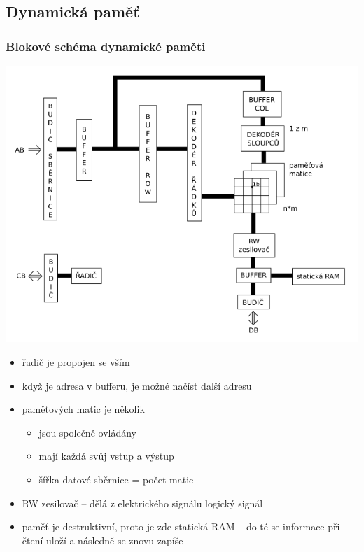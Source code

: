 \documentclass[a4paper,12pt]{article}
\providecommand{\tightlist}{%
\setlength{\itemsep}{0pt}\setlength{\parskip}{0pt}}
\begin{document}
\subsection{Dynamická paměť}

\subsubsection{Blokové schéma dynamické paměti}

\includegraphics[width=17cm]{ref/blokove-schema-dynamicke-pameti.png}

\begin{itemize}
\tightlist
\item řadič je propojen se vším
\item když je adresa v bufferu, je možné načíst další adresu
\item paměťových matic je několik

  \begin{itemize}
  \tightlist
  \item jsou společně ovládány
  \item mají každá svůj vstup a výstup
  \item šířka datové sběrnice = počet matic
  \end{itemize}
\item RW zesilovač -- dělá z elektrického signálu logický signál
\item paměť je destruktivní, proto je zde statická RAM -- do té se informace
  při čtení uloží a následně se znovu zapíše
\end{itemize}
\end{document}
